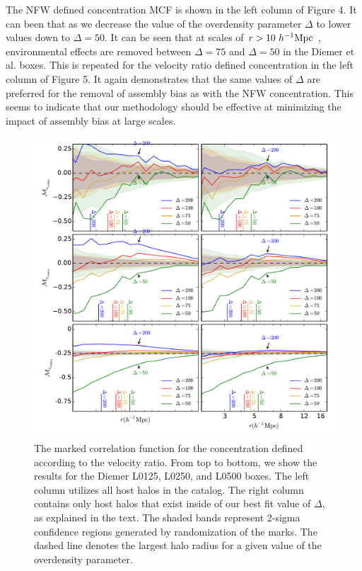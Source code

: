 \documentclass[usenatbib,usegraphicx,letterpaper]{mn2e}
\begin{document}
The NFW defined concentration MCF is shown in the left column of Figure 4. It can been that as we decrease the value of the overdensity parameter $\Delta$ to lower values down to $\Delta = 50$. It can be seen that at scales of $r > 10 \ h^{-1}\mathrm{Mpc}~$, environmental effects are removed between $\Delta = 75$ and $\Delta = 50$ in the Diemer et al. boxes. This is repeated for the velocity ratio defined concentration in the left column of Figure 5. It again demonstrates that the same values of $\Delta$ are preferred for the removal of assembly bias as with the NFW concentration. This seems to indicate that our methodology should be effective at minimizing the impact of assembly bias at large scales.

\begin{figure}
	\centering
	\includegraphics[width=\textwidth]{all_mcf_cvratio_z00_hostsvmatch.pdf}
	\caption{The marked correlation function for the concentration defined according to the velocity ratio. From top to bottom, we show the results for the Diemer L0125, L0250, and L0500 boxes. The left column utilizes all host halos in the catalog. The right column contains only host halos that exist inside of our best fit value of $\Delta$, as explained in the text. The shaded bands represent 2-sigma confidence regions generated by randomization of the marks. The dashed line denotes the largest halo radius for a given value of the overdensity parameter. }
\end{figure}
\end{document}
